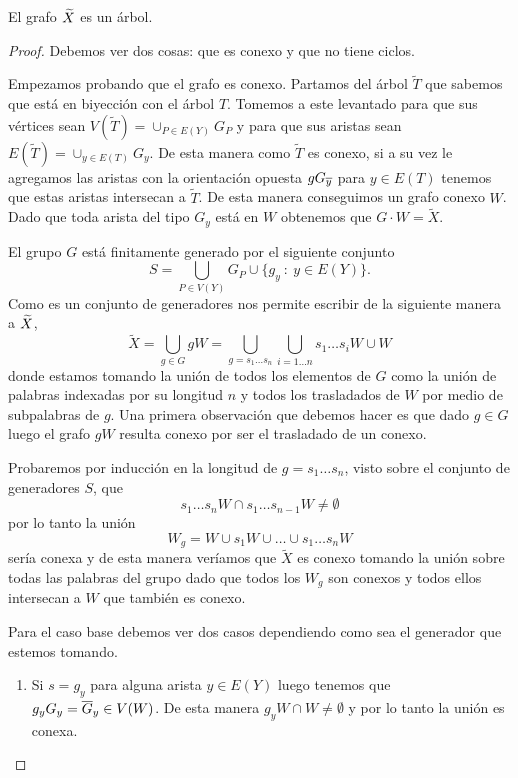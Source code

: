 \documentclass[tesis.tex]{subfiles}
\begin{document}
\begin{teo}[Serre]
	El grafo $\widetilde X$ es un árbol.
\end{teo}
\begin{proof}
	Debemos ver dos cosas: que es conexo y que no tiene ciclos.
	
	Empezamos probando que el grafo es conexo.
	Partamos del árbol $\widetilde T$ que sabemos que está en biyección con el árbol $T$.
	Tomemos a este levantado para que sus vértices sean $V(\widetilde T) = \cup_{P \in E(Y)} G_{P}$ y para que sus aristas sean $E(\widetilde T) =\cup_{y \in E(T)} G_{y}$.
	De esta manera como $\widetilde T$ es conexo, si a su vez le agregamos las aristas con la orientación opuesta $gG_{\overline y}$ para $y \in E(T)$ tenemos que estas aristas intersecan a $\tilde T$.
	De esta manera conseguimos un grafo conexo $W$.
	Dado que toda arista del tipo $G_y$ está en $W$ obtenemos que $G \cdot W = \tilde X$.
	
	El grupo $G$ está finitamente generado por el siguiente conjunto
	\[
		S = \bigcup_{P \in V(Y)} G_{P} \cup \{ g_y \ : \ y \in E(Y) \}.   
	\] 
	Como es un conjunto de generadores nos permite escribir de la siguiente manera a $\widetilde X$, 
	\[
		\tilde X = \bigcup_{g \in G} gW = \bigcup_{g=s_1 \dots s_n} \bigcup_{i=1 \dots n} s_{1}\dots s_{i} W  \cup W 
	\]  
	donde estamos tomando la unión de todos los elementos de $G$ como la unión de palabras indexadas por su longitud $n$ y todos los trasladados de $W$ por medio de subpalabras de $g$.
	Una primera observación que debemos hacer es que dado $g \in G$ luego el grafo $gW$ resulta conexo por ser el trasladado de un conexo.
	
	Probaremos por inducción en la longitud de $g=s_1\dots s_n$, visto sobre el conjunto de generadores $S$, que 
	\[
		s_1\dots s_n W \cap s_1 \dots s_{n-1}W \neq \emptyset	
	\] 
	por lo tanto la unión 
	\[
	W_g = W \cup s_1W \cup \dots \cup s_1\dots s_{n}W
	\]
	sería conexa y de esta manera veríamos que $\tilde X$ es conexo tomando la unión sobre todas las palabras del grupo dado que todos los $W_g$ son conexos y todos ellos intersecan a $W$ que también es  conexo.
	
	Para el caso base debemos ver dos casos dependiendo como sea el generador que estemos tomando.
	\begin{enumerate}
		\item Si $s=g_y$ para alguna arista $y \in E(Y)$ luego tenemos que $g_yG_y = \overline G_y \in V(W)$.
		De esta manera $g_yW \cap W \neq \emptyset$ y por lo tanto la unión es conexa.		
		

\end{enumerate}
\end{proof}
\end{document}
